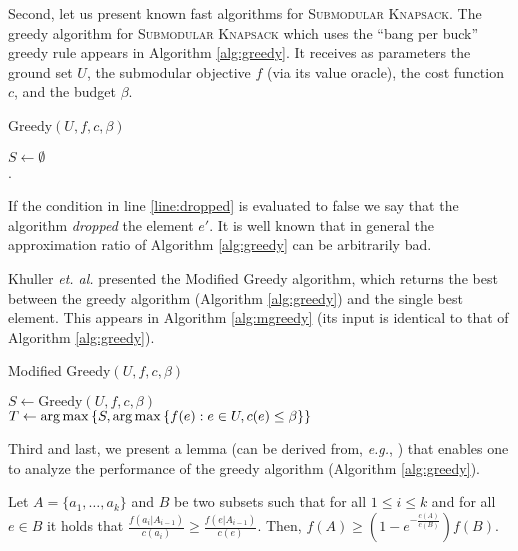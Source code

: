 \documentclass[a4paper,UKenglish,cleveref, autoref]{lipics-v2019}
\newcommand{\SK}{{\textsc{Submodular Knapsack}}\xspace}
\begin{document}
Second, let us present known fast algorithms for \SK.
The greedy algorithm for \SK which uses the ``bang per buck'' greedy rule appears in Algorithm \ref{alg:greedy}.
It receives as parameters the ground set $U$, the submodular objective $f$ (via its value oracle), the cost function $c$, and the budget $\beta$.

\begin{algorithm}[H]
\caption{Greedy$(U, f, c, \beta)$}
\label{alg:greedy}
$S \leftarrow \emptyset$
\\
.
\end{algorithm}

If the condition in line \ref{line:dropped} is evaluated to false we say that
the algorithm \emph{dropped} the element $e'$.
It is well known that in general the approximation ratio of Algorithm \ref{alg:greedy}
can be arbitrarily bad.

Khuller {\em et. al.} \cite{khuller1999budgeted} presented the Modified Greedy algorithm, which returns the best between the greedy algorithm (Algorithm \ref{alg:greedy}) and the single best element.
This appears in Algorithm \ref{alg:mgreedy} (its input is identical to that of Algorithm \ref{alg:greedy}).

\begin{algorithm}[H]
\caption{Modified Greedy$(U, f, c, \beta)$}
\label{alg:mgreedy}

$S \leftarrow \text{Greedy}(U, f, c, \beta)$
\\
$T \leftarrow \operatorname*{arg\,max}\left\{S, \operatorname*{arg\,max} \left\{f(e):e\in U, c(e)\leq \beta \right\} \right\}$
\\
\end{algorithm}

Third and last, we present a lemma (can be derived from, {\em e.g.}, \cite{khuller1999budgeted}) that enables one to analyze the performance of the greedy algorithm (Algorithm \ref{alg:greedy}).
\begin{lemma}
\label{lemma:sub-main}
Let $A = \{a_1, \dots, a_k\}$ and $B$ be two subsets such that for all $1 \leq i \leq k$
and for all $e \in B$ it holds that
$\frac{f(a_i|A_{i-1})}{c(a_i)} \geq \frac{f(e|A_{i-1})}{c(e)}$.
Then, $f(A) \geq (1 - e^{-\frac{c(A)}{c(B)}})f(B)$.
\end{lemma}
\end{document}
